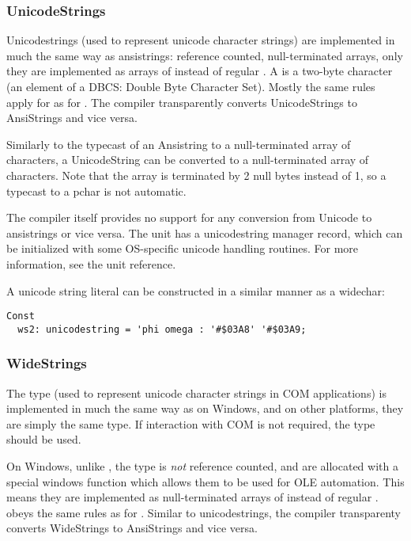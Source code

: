 \subsubsection{UnicodeStrings}
Unicodestrings (used to represent unicode character strings) are implemented in much 
the same way as ansistrings: reference counted, null-terminated arrays, only they 
are implemented as arrays of  instead of regular .
A  is a two-byte character (an element of a DBCS: Double Byte
Character Set). Mostly the same rules apply for  as for
. The compiler transparently converts UnicodeStrings to
AnsiStrings and vice versa. 

Similarly to the typecast of an Ansistring to a  null-terminated
 array of characters, a UnicodeString can be converted to a 
 null-terminated array of characters. Note that the
 array is terminated by 2 null bytes instead of
1, so a typecast to a pchar is not automatic.

The compiler itself provides no support for any conversion from Unicode to
ansistrings or vice versa. The  unit has a unicodestring manager
record, which can be initialized with some OS-specific unicode handling
routines. For more information, see the  unit reference.

A unicode string literal can be constructed in a similar manner as a widechar:
\begin{verbatim}
Const
  ws2: unicodestring = 'phi omega : '#$03A8' '#$03A9;
\end{verbatim}


\subsubsection{WideStrings}
The  type (used to represent unicode character strings in COM applications)
is implemented in much the same way as  on Windows, and on other 
platforms, they are simply the same type. If interaction with COM is not required, 
the  type should be used.
 
On Windows, unlike , the  type is \emph{not} reference counted, 
and are allocated with a special windows function which allows them to be used for OLE automation.
This means they are implemented as null-terminated arrays of  instead of regular . 
 obeys the same rules as for . 
Similar to unicodestrings, the compiler transparenty converts WideStrings 
to AnsiStrings and vice versa. 

